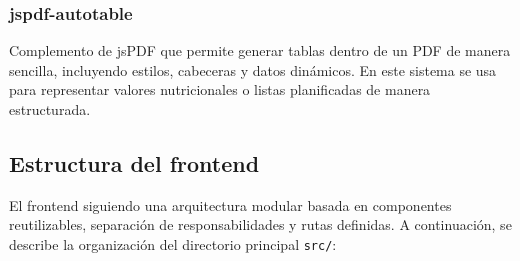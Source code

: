 \subsubsection*{jspdf-autotable\cite{jspdfautotable}}
Complemento de jsPDF que permite generar tablas dentro de un PDF de manera sencilla, incluyendo estilos, cabeceras y datos dinámicos. En este sistema se usa para representar valores nutricionales o listas planificadas de manera estructurada.

\subsection{Estructura del frontend}
El frontend siguiendo una arquitectura modular basada en componentes reutilizables, separación de responsabilidades y rutas definidas. A continuación, se describe la organización del directorio principal \texttt{src/}:

